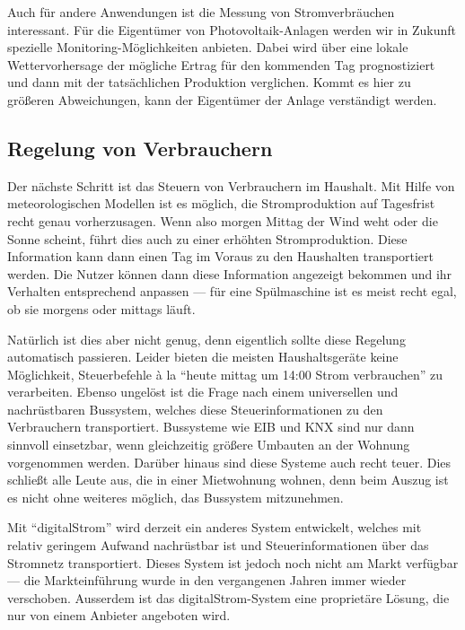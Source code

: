 \documentclass[12pt,BCOR=8.5mm]{scrartcl}
\begin{document}
Auch für andere Anwendungen ist die Messung von Stromverbräuchen
interessant. Für die Eigentümer von Photovoltaik-Anlagen werden wir in
Zukunft spezielle Monitoring-Möglichkeiten anbieten. Dabei wird über
eine lokale Wettervorhersage der mögliche Ertrag für den kommenden Tag
prognostiziert und dann mit der tatsächlichen Produktion verglichen.
Kommt es hier zu größeren Abweichungen, kann der Eigentümer der Anlage
verständigt werden.

\subsection{Regelung von Verbrauchern}\label{sub:steuern}

Der nächste Schritt ist das Steuern von Verbrauchern im Haushalt.
Mit Hilfe von meteorologischen Modellen ist es möglich, die
Stromproduktion auf Tagesfrist recht genau vorherzusagen. Wenn also
morgen Mittag der Wind weht oder die Sonne scheint, führt dies auch zu
einer erhöhten Stromproduktion. Diese Information kann dann einen Tag im
Voraus zu den Haushalten transportiert werden. Die Nutzer können dann
diese Information angezeigt bekommen und ihr Verhalten entsprechend
anpassen --- für eine Spülmaschine ist es meist recht egal, ob sie
morgens oder mittags läuft.

Natürlich ist dies aber nicht genug, denn eigentlich sollte diese
Regelung automatisch passieren. Leider bieten die meisten
Haushaltsgeräte keine Möglichkeit, Steuerbefehle à la "`heute mittag um
14:00 Strom verbrauchen"' zu verarbeiten. Ebenso ungelöst ist die Frage
nach einem universellen und nachrüstbaren Bussystem, welches diese
Steuerinformationen zu den Verbrauchern transportiert. Bussysteme wie
EIB und KNX sind nur dann sinnvoll einsetzbar, wenn gleichzeitig größere
Umbauten an der Wohnung vorgenommen werden. Darüber hinaus sind diese
Systeme auch recht teuer. Dies schließt alle Leute aus, die in einer
Mietwohnung wohnen, denn beim Auszug ist es nicht ohne weiteres
möglich, das Bussystem mitzunehmen.

Mit "`digitalStrom"' wird derzeit ein anderes System entwickelt, welches
mit relativ geringem Aufwand nachrüstbar ist und Steuerinformationen
über das Stromnetz transportiert. Dieses System ist jedoch noch nicht am
Markt verfügbar --- die Markteinführung wurde in den vergangenen Jahren
immer wieder verschoben. Ausserdem ist das digitalStrom-System eine
proprietäre Lösung, die nur von einem Anbieter angeboten wird. 
\end{document}
